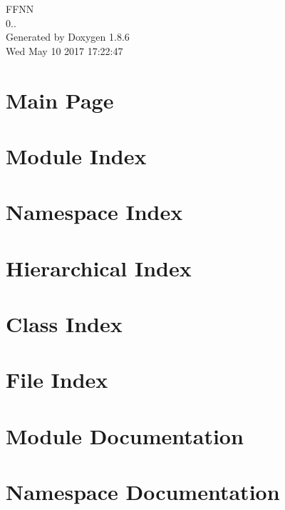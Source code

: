 \documentclass[twoside]{book}
\newcommand{\clearemptydoublepage}{%
  \newpage{\pagestyle{empty}\cleardoublepage}%
}
\begin{document}
\hypersetup{pageanchor=false}
\begin{titlepage}
\vspace*{7cm}
\begin{center}%
{\Large F\-F\-N\-N \\[1ex]\large 0.. }\\
\vspace*{1cm}
{\large Generated by Doxygen 1.8.6}\\
\vspace*{0.5cm}
{\small Wed May 10 2017 17:22:47}\\
\end{center}
\end{titlepage}
\clearemptydoublepage
\tableofcontents
\clearemptydoublepage
{}
\hypersetup{pageanchor=true}

\chapter{Main Page}
\label{index}\hypertarget{index}{}
\chapter{Module Index}

\chapter{Namespace Index}

\chapter{Hierarchical Index}

\chapter{Class Index}

\chapter{File Index}

\chapter{Module Documentation}

\chapter{Namespace Documentation}














\end{document}
